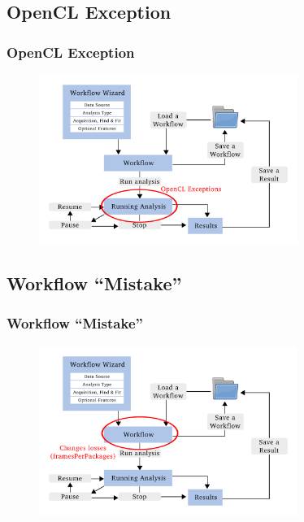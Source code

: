 \documentclass[aspectratio=169]{beamer}
\begin{document}
\subsection{OpenCL Exception}
\begin{frame}
\frametitle{OpenCL Exception}
\begin{figure}[h!]
    \centering	\includegraphics[width=0.75\textwidth]{./images/opencl_error.pdf} 
    \end{figure} 
 
\end{frame}

\subsection{Workflow ``Mistake''}
\begin{frame}
\frametitle{Workflow ``Mistake''}
\begin{figure}[h!]
    \centering	\includegraphics[width=0.75\textwidth]{./images/workflow_error.pdf} 
    \end{figure} 

    
\end{frame}
\end{document}
